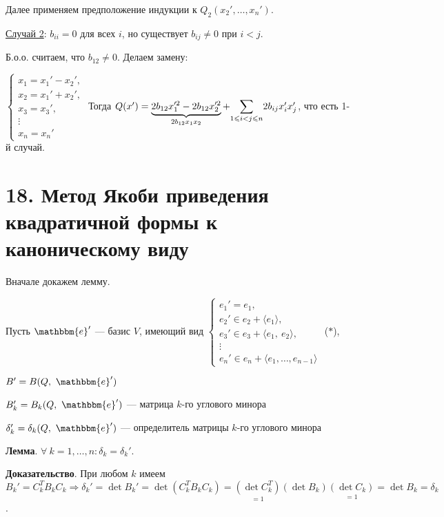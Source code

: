 \documentclass[a4paper, 12pt]{article}
\newcommand{\me}{\mathbbm{e}}
\begin{document}
Далее применяем предположение индукции к $Q_2(x_2', \ldots, x_n')$.

\vspace{3mm}
\underline{Случай 2}: $b_{ii} = 0$ для всех $i$, но существует $b_{ij} \neq 0$ при $i < j$.

Б.о.о. считаем, что $b_{12} \neq 0$. Делаем замену:

\vspace{2mm}
$
\begin{cases*}
x_1 = x_1' - x_2', \\
x_2 = x_1' + x_2', \\
x_3 = x_3', \\[-0.5em]
\vdots \\[-0.5em]
x_n = x_n'
\end{cases*}
$ Тогда $Q(x') = \underbrace{2b_{12}x_1'^2 - 2b_{12}x_2'^2}_{2b_{12}x_1x_2} + \mathlarger{\sum}\limits_{1 \leqslant i < j \leqslant n}2b_{ij}x_i'x_j'$, что есть 1-й случай.

\section*{18. Метод Якоби приведения квадратичной формы к каноническому виду}
Вначале докажем лемму.

Пусть $\me'$ --- базис $V$, имеющий вид $
\begin{cases*}
e_1' = e_1, \\
e_2' \in e_2 + \langle e_1 \rangle, \\
e_3' \in e_3 + \langle e_1,\ e_2 \rangle, \\[-0.5em]
\vdots \\[-0.5em]
e_n' \in e_n + \langle e_1, \ldots, e_{n - 1} \rangle
\end{cases*}$ ($*$),

\vspace{-11mm}
$B' = B(Q,\ \me')$

 $B_k' = B_k(Q,\ \me')$ --- матрица $k$-го углового минора

$\delta_k' = \delta_k(Q,\ \me')$ --- определитель матрицы $k$-го углового минора

\vspace{2mm}
\textbf{Лемма}. $\forall\ k = 1, \ldots, n: \delta_k = \delta_k'$.

\textbf{Доказательство}. При любом $k$ имеем $B_k' = C_k^TB_kC_k \Rightarrow \delta_k' = \det B_k' = \det(C_k^TB_kC_k) = \underset{=1}{(\det C_k^T)} (\det B_k) \underset{=1}{(\det C_k)} = \det B_k = \delta_k$.
\end{document}

